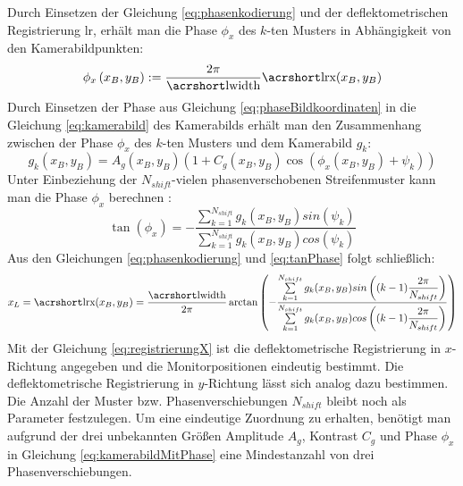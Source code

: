 \p
Durch Einsetzen der Gleichung \ref{eq:phasenkodierung} und der deflektometrischen Registrierung \acrshort{lr}, erhält man die Phase $\phi_x$ des $k$-ten Musters in Abhängigkeit von den Kamerabildpunkten:
%
\begin{equation}\label{eq:phaseBildkoordinaten}
	\phi_x\left(x_B,y_B\right) := \dfrac{2\pi}{\acrshortmath{lwidth}}\acrshortmath{lrx}(x_B, y_B)
\end{equation}
%
Durch Einsetzen der Phase aus Gleichung \ref{eq:phaseBildkoordinaten} in die Gleichung \ref{eq:kamerabild} des Kamerabilds erhält man den Zusammenhang zwischen der Phase $\phi_x$ des $k$-ten Musters und dem Kamerabild $g_k$:
%
\begin{equation}\label{eq:kamerabildMitPhase}
	g_k(x_B, y_B) = A_g(x_B, y_B) \left(1 + C_g(x_B, y_B) \cos \left(\phi_x(x_B, y_B) + \psi_k\right)\right)
\end{equation}
%
Unter Einbeziehung der $N_{shift}$-vielen phasenverschobenen Streifenmuster kann man die Phase $\phi_x$ berechnen \cite{kit_werling}:
%
\begin{equation}\label{eq:tanPhase}
	\tan (\phi_x) = -\dfrac{\sum\limits_{k=1}^{N_{shift}} g_k(x_B, y_B) sin(\psi_k)}{\sum\limits_{k=1}^{N_{shift}} g_k(x_B, y_B) cos(\psi_k)}
\end{equation}
%
Aus den Gleichungen \ref{eq:phasenkodierung} und \ref{eq:tanPhase} folgt schließlich:
%
\begin{equation}\label{eq:registrierungX}
	x_L = \acrshortmath{lrx}(x_B, y_B) = 
	\dfrac{\acrshortmath{lwidth}}{2\pi}
	\arctan 
	\left( 
		-\dfrac
		{\sum\limits_{k=1}^{N_{shift}} g_k(x_B, y_B) sin\left((k - 1)\dfrac{2\pi}{N_{shift}}\right)}
		{\sum\limits_{k=1}^{N_{shift}} g_k(x_B, y_B) cos\left((k - 1)\dfrac{2\pi}{N_{shift}}\right)}
	\right)
\end{equation}
%
Mit der Gleichung \ref{eq:registrierungX} ist die deflektometrische Registrierung in $x$-Richtung angegeben und die Monitorpositionen eindeutig bestimmt.
Die deflektometrische Registrierung in $y$-Richtung lässt sich analog dazu bestimmen.
Die Anzahl der Muster bzw. Phasenverschiebungen $N_{shift}$ bleibt noch als Parameter festzulegen.
Um eine eindeutige Zuordnung zu erhalten, benötigt man aufgrund der drei unbekannten Größen Amplitude $A_g$, Kontrast $C_g$ und Phase $\phi_x$ in Gleichung \ref{eq:kamerabildMitPhase} eine Mindestanzahl von drei Phasenverschiebungen.

